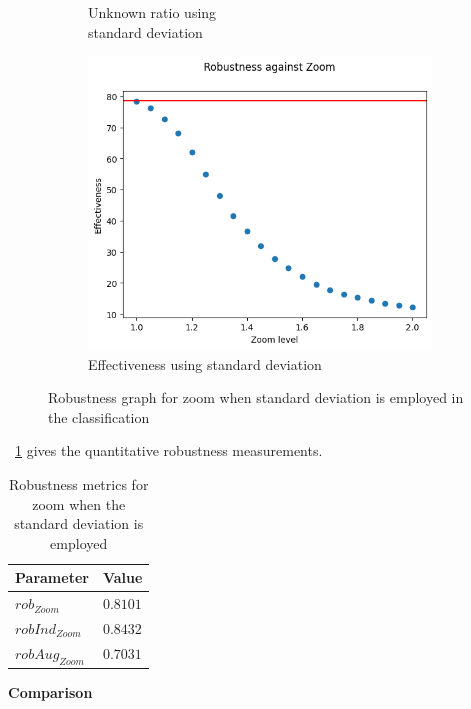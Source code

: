 \begin{figure}[h]
\begin{subfigure}{.33\textwidth}
		\caption{Unknown ratio using \\ standard deviation}
		\label{fig:zo_vu_unkn}
	\end{subfigure}%
	\begin{subfigure}{.33\textwidth}
		\centering
		\includegraphics[width=0.9\linewidth]{ImageFiles/EvalBNN/ZO/VU/eff}
		\caption{Effectiveness using standard deviation}
		\label{fig:zo_vu_eff}
	\end{subfigure}
	\caption{Robustness graph for zoom when standard deviation is employed in the classification}
	\label{fig:zo_vu}
\end{figure}

\Tab~\ref{table:rob_zo_vu} gives the quantitative robustness measurements.

\begin{table}[h]
	\centering
	\begin{tabular}{|| l | l ||} 
		\hline
		\textbf{Parameter} & \textbf{Value} \\
		\hline
		\hline
		$rob_{Zoom}$ & $0.8101$ \\
		$robInd_{Zoom}$ & $0.8432$ \\
		$robAug_{Zoom}$ & $0.7031$ \\	
		\hline
	\end{tabular}	
	\caption{Robustness metrics for zoom when the standard deviation is employed}
	\label{table:rob_zo_vu}
\end{table}

\vspace{0.3cm}
\textbf{Comparison}
\vspace{0.1cm}

